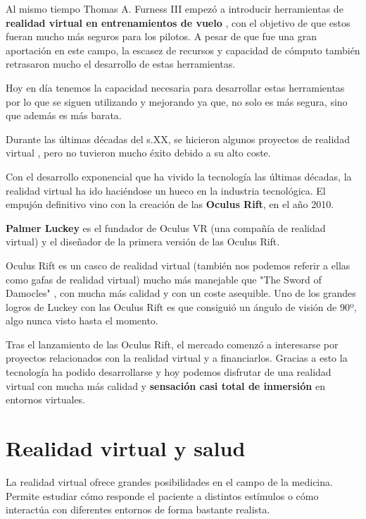 \documentclass[twoside, 12pt]{epstfg}
\begin{document}
Al mismo tiempo Thomas A. Furness III empezó a introducir herramientas de \textbf{realidad virtual en entrenamientos de vuelo} \cite{kocian1977visually}, con el objetivo de que estos fueran mucho más seguros para los pilotos.
A pesar de que fue una gran aportación en este campo, la escasez de recursos y capacidad de cómputo también retrasaron mucho el desarrollo de estas herramientas.
 
Hoy en día tenemos la capacidad necesaria para desarrollar estas herramientas por lo que se siguen utilizando y mejorando ya que, no solo es más segura, sino que además es más barata.

Durante las últimas décadas del s.XX, se hicieron algunos proyectos de realidad virtual , pero no tuvieron mucho éxito debido a su alto coste.

Con el desarrollo exponencial que ha vivido la tecnología las últimas décadas, la realidad virtual ha ido haciéndose un hueco en la industria tecnológica.
El empujón definitivo vino con la creación de las \textbf{Oculus Rift}, en el año 2010.

\textbf{Palmer Luckey} es el fundador de Oculus VR (una compañía de realidad virtual) y el diseñador de la primera versión de las Oculus Rift.

Oculus Rift es un casco de realidad virtual (también nos podemos referir a ellas como gafas de realidad virtual) mucho más manejable que "The Sword of Damocles" , con mucha más calidad y con un coste asequible.
Uno de los grandes logros de Luckey con las Oculus Rift es que consiguió un ángulo de visión de 90º, algo nunca visto hasta el momento.

Tras el lanzamiento de las Oculus Rift, el mercado comenzó a interesarse por proyectos relacionados con la realidad virtual y a financiarlos.
Gracias a esto la tecnología ha podido desarrollarse y hoy podemos disfrutar de una realidad virtual con mucha más calidad y \textbf{sensación casi total de inmersión} en entornos virtuales.




\section{Realidad virtual y salud}
\label{sec:VR y salud}

La realidad virtual ofrece grandes posibilidades en el campo de la medicina. Permite estudiar cómo responde el paciente a distintos estímulos o cómo interactúa con diferentes entornos de forma bastante realista.
\end{document}
